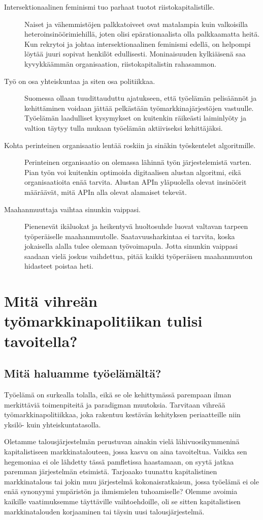 \documentclass[nobib,finnish,oneside,openany,notoc,a4paper]{tufte-book}
\begin{document}
\begin{description}
    \item[Intersektionaalinen feminismi tuo parhaat tuotot riistokapitalistille.] Naiset ja vähemmistöjen palkkatoiveet ovat matalampia kuin valkoisilla heteroinsinöörimiehillä, joten olisi epärationaalista olla palkkaamatta heitä. Kun rekrytoi ja johtaa intersektionaalinen feminismi edellä, on helpompi löytää juuri sopivat henkilöt edullisesti. Moninaisuuden kylkiäisenä saa kyvykkäämmän organisaation, riistokapitalistin rahasammon.
    \item[Työ on osa yhteiskuntaa ja siten osa politiikkaa.] Suomessa ollaan tuudittauduttu ajatukseen, että työelämän pelisäännöt ja kehittäminen voidaan jättää pelkästään työmarkkinajärjestöjen vastuulle. Työelämän laadulliset kysymykset on kuitenkin räikeästi laiminlyöty ja valtion täytyy tulla mukaan työelämän aktiiviseksi kehittäjäksi.
    \item[Kohta perinteinen organisaatio lentää roskiin ja sinäkin työskentelet algoritmille.]  Perinteinen organisaatio on olemassa lähinnä työn järjestelemistä varten. Pian työn voi kuitenkin optimoida digitaalisen alustan algoritmi, eikä organisaatioita enää tarvita. Alustan APIn yläpuolella olevat insinöörit määräävät, mitä APIn alla olevat alamaiset tekevät.
    \item[Maahanmuuttaja vaihtaa sinunkin vaippasi.] Pienenevät ikäluokat ja heikentyvä huoltosuhde luovat valtavan tarpeen työperäiselle maahanmuutolle. Saatavuusharkintaa ei tarvita, koska jokaisella alalla tulee olemaan työvoimapula. Jotta sinunkin vaippasi saadaan vielä joskus vaihdettua, pitää kaikki työperäisen maahanmuuton hidasteet poistaa heti.
\end{description}

\part{Mitä vihreän työmarkkinapolitiikan tulisi tavoitella?}

\chapter{Mitä haluamme työelämältä?}

Työelämä on surkealla tolalla, eikä se ole kehittymässä parempaan ilman merkittäviä toimenpiteitä ja paradigman muutoksia. Tarvitaan vihreää työmarkkinapolitiikkaa, joka rakentuu kestävän kehityksen periaatteille niin yksilö- kuin yhteiskuntatasolla. 

Oletamme talousjärjestelmän perustuvan ainakin vielä lähivuosikymmeninä kapitalistiseen markkinatalouteen, jossa kasvu on aina tavoiteltua.  Vaikka sen hegemoniaa ei ole lähdetty tässä pamfletissa haastamaan, on syytä jatkaa paremman järjestelmän etsimistä. Tarjoaako tuunattu kapitalistinen markkinatalous tai jokin muu järjestelmä kokonaisratkaisun, jossa työelämä ei ole enää synonyymi ympäristön ja ihmismielen tuhoamiselle? Olemme avoimia kaikille vaatimuksemme täyttäville vaihtoehdoille, oli se sitten kapitalistisen markkinatalouden korjaaminen tai täysin uusi talousjärjestelmä. 
\end{document}

